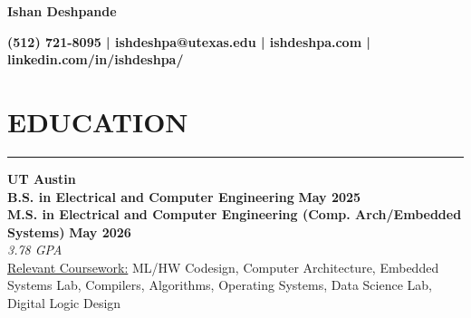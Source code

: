 \documentclass{article}
\newcommand{\sectionHeader}[1]{%
    \vspace{-1.5\baselineskip}
    \section*{\MakeUppercase{\large #1}} %
    \vspace{-1.75\baselineskip} %
    \color{teal}
    \rule{\textwidth}{2pt} %
    \color{black}
    \vspace{-1.5\baselineskip}
}
\begin{document}
\begin{center}
    \textbf{\LARGE Ishan Deshpande}
\end{center}

\begin{center}
    \textbf{\small (512) 721-8095 | ishdeshpa@utexas.edu | ishdeshpa.com | linkedin.com/in/ishdeshpa/}
\end{center}

\sectionHeader{education}       
\begin{flushleft}
    \vspace{2.5pt}
    \textbf{\large UT Austin} \\
    \textbf{B.S. in Electrical and Computer Engineering} \hfill \textbf{May 2025} \\
    \textbf{M.S. in Electrical and Computer Engineering (Comp. Arch/Embedded Systems)} \hfill \textbf{May 2026} \\
    \textit{3.78 GPA} \\
    \underline{Relevant Coursework:} ML/HW Codesign, Computer Architecture, Embedded Systems Lab, Compilers, Algorithms, Operating Systems, Data Science Lab, Digital Logic Design
\end{flushleft}
\end{document}
